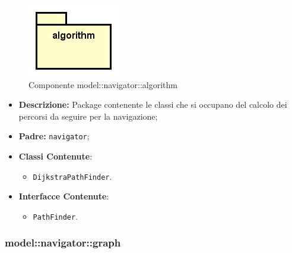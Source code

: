\documentclass[../DefinizioneDiProdotto.tex]{subfiles}
\begin{document}
    \begin{figure}[H]
        \centering
        \includegraphics{img/package/algorithm.png}
        \caption{Componente model::\-navigator::\-algorithm}\label{fig:model::navigator::algorithm} 
    \end{figure}
    \begin{itemize}
\item \textbf{Descrizione:} Package contenente le classi che si occupano del calcolo dei percorsi da seguire per la navigazione;
\item \textbf{Padre:} \texttt{navigator};
\item \textbf{Classi Contenute}:
\begin{itemize}
\item \texttt{DijkstraPathFinder}.

\end{itemize}
\item \textbf{Interfacce Contenute}:
\begin{itemize}
\item \texttt{PathFinder}.

\end{itemize}
\end{itemize}

\subsubsection{model::\-navigator::\-graph}
\end{document}
